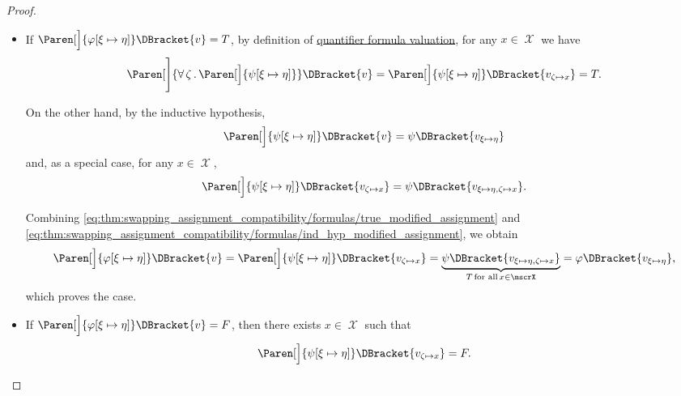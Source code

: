 \begin{proof}
\begin{itemize}
\begin{itemize}
      \begin{itemize}
        \item If \( \Paren[\Big]{\varphi[\xi \mapsto \eta]}\DBracket{v} = T \), by definition of \hyperref[def:first_order_valuation/formula_valuation]{quantifier formula valuation}, for any \( x \in \mscrX \) we have
        \begin{equation}\label{eq:thm:swapping_assignment_compatibility/formulas/true_modified_assignment}
          \Paren[\Bigg]{\Qnt{\forall}{\zeta} \Paren[\Big]{ \psi[\xi \mapsto \eta] }}\DBracket{v}
          =
          \Paren[\Big]{\psi[\xi \mapsto \eta]}\DBracket{v_{\zeta \mapsto x}}
          =
          T.
        \end{equation}

        On the other hand, by the inductive hypothesis,
        \begin{equation*}
          \Paren[\Big]{ \psi[\xi \mapsto \eta] }\DBracket{v} = \psi\DBracket{v_{\xi \mapsto \eta}}
        \end{equation*}
        and, as a special case, for any \( x \in \mscrX \),
        \begin{equation}\label{eq:thm:swapping_assignment_compatibility/formulas/ind_hyp_modified_assignment}
          \Paren[\Big]{ \psi[\xi \mapsto \eta] }\DBracket{v_{\zeta \mapsto x}} = \psi\DBracket{v_{\xi \mapsto \eta, \zeta \mapsto x}}.
        \end{equation}

        Combining \eqref{eq:thm:swapping_assignment_compatibility/formulas/true_modified_assignment} and \eqref{eq:thm:swapping_assignment_compatibility/formulas/ind_hyp_modified_assignment}, we obtain
        \begin{equation*}
          \Paren[\Big]{ \varphi[\xi \mapsto \eta] }\DBracket{v}
          =
          \Paren[\Big]{ \psi[\xi \mapsto \eta] }\DBracket{v_{\zeta \mapsto x}}
          =
          \underbrace{\psi\DBracket{v_{\xi \mapsto \eta, \zeta \mapsto x}}}_{T \T{for all} x \in \mscrX}
          =
          \varphi\DBracket{v_{\xi \mapsto \eta}},
        \end{equation*}
        which proves the case.

        \item If \( \Paren[\Big]{\varphi[\xi \mapsto \eta]}\DBracket{v} = F \), then there exists \( x \in \mscrX \) such that
        \begin{equation*}
          \Paren[\Big]{\psi[\xi \mapsto \eta]}\DBracket{v_{\zeta \mapsto x}} = F.
        \end{equation*}


\end{itemize}
\end{itemize}
\end{itemize}
\end{proof}
